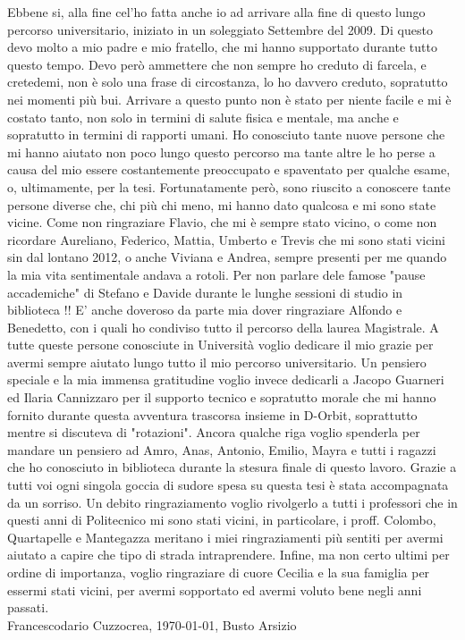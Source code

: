 Ebbene si, alla fine cel'ho fatta anche io ad arrivare alla fine di questo lungo percorso universitario, iniziato in un soleggiato Settembre del 2009. Di questo devo molto a mio padre e mio fratello, che mi hanno supportato durante tutto questo tempo. Devo però ammettere che non sempre ho creduto di farcela, e cretedemi, non è solo una frase di circostanza, lo ho davvero creduto, sopratutto nei momenti più bui. Arrivare a questo punto non è stato per niente facile e mi è costato tanto, non solo in termini di salute fisica e mentale, ma anche e sopratutto in termini di rapporti umani. Ho conosciuto tante nuove persone che mi hanno aiutato non poco lungo questo percorso ma tante altre le ho perse a causa del mio essere costantemente preoccupato e spaventato per qualche esame, o, ultimamente, per la tesi. Fortunatamente però, sono riuscito a conoscere tante persone diverse che, chi più chi meno, mi hanno dato qualcosa e mi sono state vicine. Come non ringraziare Flavio, che mi è sempre stato vicino, o come non ricordare Aureliano, Federico, Mattia, Umberto e Trevis che mi sono stati vicini sin dal lontano 2012, o anche Viviana e Andrea, sempre presenti per me quando la mia vita sentimentale andava a rotoli. Per non parlare dele famose "pause accademiche" di Stefano e Davide durante le lunghe sessioni di studio in biblioteca !! E' anche doveroso da parte mia dover ringraziare Alfondo e Benedetto, con i quali ho condiviso tutto il percorso della laurea Magistrale. A tutte queste persone conosciute in Università voglio dedicare il mio grazie per avermi sempre aiutato lungo tutto il mio percorso universitario. Un pensiero speciale e la mia immensa gratitudine voglio invece dedicarli a Jacopo Guarneri ed Ilaria Cannizzaro per il supporto tecnico e sopratutto morale che mi hanno fornito durante questa avventura trascorsa insieme in D-Orbit, soprattutto mentre si discuteva di "rotazioni". Ancora qualche riga voglio spenderla per mandare un pensiero ad Amro, Anas, Antonio, Emilio, Mayra e tutti i ragazzi che ho conosciuto in biblioteca durante la stesura finale di questo lavoro. Grazie a tutti voi ogni singola goccia di sudore spesa su questa tesi è stata accompagnata da un sorriso. Un debito ringraziamento voglio rivolgerlo a tutti i professori che in questi anni di Politecnico mi sono stati vicini, in particolare, i proff. Colombo, Quartapelle e Mantegazza meritano i miei ringraziamenti più sentiti per avermi aiutato a capire che tipo di strada intraprendere.
Infine, ma non certo ultimi per ordine di importanza, voglio ringraziare di cuore Cecilia e la sua famiglia per essermi stati vicini, per avermi sopportato ed avermi voluto bene negli anni passati.\\


Francescodario Cuzzocrea, \today, Busto Arsizio